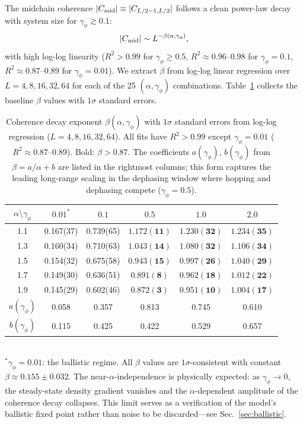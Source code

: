 \documentclass[aps,prb,twocolumn,superscriptaddress,floatfix]{revtex4-2}
\begin{document}
The midchain coherence $|C_{\rm mid}| \equiv |C_{L/2-1, L/2}|$ follows a clean power-law decay with system size for $\gamma_\phi \gtrsim 0.1$:
\begin{equation}
|C_{\rm mid}| \sim L^{-\beta(\alpha,\gamma_\phi)},
\label{eq:beta_def}
\end{equation}
with high log-log linearity ($R^2 > 0.99$ for $\gamma_\phi \ge 0.5$, $R^2 \approx 0.96$--$0.98$ for $\gamma_\phi = 0.1$, $R^2 \approx 0.87$--$0.89$ for $\gamma_\phi = 0.01$). We extract $\beta$ from log-log linear regression over $L = 4, 8, 16, 32, 64$ for each of the 25 $(\alpha, \gamma_\phi)$ combinations. Table~\ref{tab:beta} collects the baseline $\beta$ values with $1\sigma$ standard errors.

\begin{table}[tbp]
\caption{Coherence decay exponent $\beta(\alpha,\gamma_\phi)$ with $1\sigma$ standard errors from log-log regression ($L = 4, 8, 16, 32, 64$). All fits have $R^2 > 0.99$ except $\gamma_\phi = 0.01$ ($R^2 \approx 0.87$--$0.89$). Bold: $\beta > 0.87$. The coefficients $a(\gamma_\phi)$, $b(\gamma_\phi)$ from $\beta = a/\alpha + b$ are listed in the rightmost columns; this form captures the leading long-range scaling in the dephasing window where hopping and dephasing compete ($\gamma_\phi = 0.5$).}
\label{tab:beta}
\begin{ruledtabular}
\begin{tabular}{cccccc}
$\alpha \setminus \gamma_\phi$ & $0.01^*$ & $0.1$ & $0.5$ & $1.0$ & $2.0$ \\
\hline
1.1 & 0.167(37) & 0.739(65) & $\mathbf{1.172(11)}$ & $\mathbf{1.230(32)}$ & $\mathbf{1.234(35)}$ \\
1.3 & 0.160(34) & 0.710(63) & $\mathbf{1.043(14)}$ & $\mathbf{1.080(32)}$ & $\mathbf{1.106(34)}$ \\
1.5 & 0.154(32) & 0.675(58) & $\mathbf{0.943(15)}$ & $\mathbf{0.997(26)}$ & $\mathbf{1.040(29)}$ \\
1.7 & 0.149(30) & 0.636(51) & $\mathbf{0.891(8)}$ & $\mathbf{0.962(18)}$ & $\mathbf{1.012(22)}$ \\
1.9 & 0.145(29) & 0.602(46) & $\mathbf{0.872(3)}$ & $\mathbf{0.951(10)}$ & $\mathbf{1.004(17)}$ \\
\hline
$a(\gamma_\phi)$ & 0.058 & 0.357 & 0.813 & 0.745 & 0.610 \\
$b(\gamma_\phi)$ & 0.115 & 0.425 & 0.422 & 0.529 & 0.657
\end{tabular}
\end{ruledtabular}
\\[2pt] \footnotesize $^*\gamma_\phi = 0.01$: the ballistic regime. All $\beta$ values are $1\sigma$-consistent with constant $\beta \approx 0.155 \pm 0.032$. The near-$\alpha$-independence is physically expected: as $\gamma_\phi \to 0$, the steady-state density gradient vanishes and the $\alpha$-dependent amplitude of the coherence decay collapses. This limit serves as a verification of the model's ballistic fixed point rather than noise to be discarded---see Sec.~\ref{sec:ballistic}.
\end{table}
\end{document}
